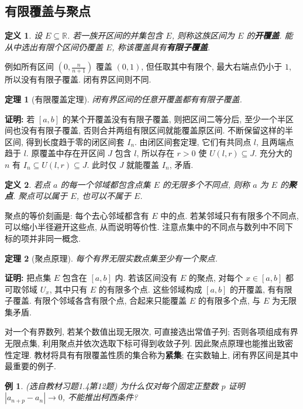 \documentclass[UTF8,openany]{ctexbook}
\theoremstyle{chinesetextbook}
\newtheorem{definition}{定义}[section]
\newtheorem{example}{例}[section]
\newtheorem{theorem}{定理}[section]
\newenvironment{cnproof}{\par\indent\textbf{证明:} \ignorespaces}{\par}
\begin{document}
\subsection{有限覆盖与聚点}
\begin{definition}
设 $E\subseteq\mathbb R$. 若一族开区间的并集包含 $E$, 则称这族区间为 $E$ 的\textbf{开覆盖}. 能从中选出有限个区间仍覆盖 $E$, 称该覆盖具有\textbf{有限子覆盖}.
\end{definition}
例如所有区间 $\displaystyle (0,\frac n{n+1})$ 覆盖 $(0,1)$, 但任取其中有限个, 最大右端点仍小于 $1$, 所以没有有限子覆盖. 闭有界区间则不同.
\begin{theorem}[有限覆盖定理]
闭有界区间的任意开覆盖都有有限子覆盖.
\end{theorem}
\begin{cnproof}
若 $[a,b]$ 的某个开覆盖没有有限子覆盖, 则把区间二等分后, 至少一个半区间也没有有限子覆盖, 否则合并两组有限区间就能覆盖原区间. 不断保留这样的半区间, 得到长度趋于零的闭区间套 $I_n$. 由闭区间套定理, 它们有共同点 $l$, 且两端点趋于 $l$. 原覆盖中存在开区间 $J$ 包含 $l$, 所以存在 $r>0$ 使 $U(l,r)\subseteq J$. 充分大的 $n$ 有 $I_n\subseteq U(l,r)\subseteq J$. 此时仅 $J$ 就能覆盖 $I_n$, 矛盾.
\end{cnproof}
\begin{definition}
若点 $a$ 的每一个邻域都包含点集 $E$ 的无限多个不同点, 则称 $a$ 为 $E$ 的\textbf{聚点}. 聚点可以属于 $E$, 也可以不属于 $E$.
\end{definition}
聚点的等价刻画是: 每个去心邻域都含有 $E$ 中的点. 若某邻域只有有限多个不同点, 可以缩小半径避开这些点, 从而说明等价性. 注意点集中的不同点与数列中不同下标的项并非同一概念.
\begin{theorem}[聚点原理]
每个有界无限实数点集至少有一个聚点.
\end{theorem}
\begin{cnproof}
把点集 $E$ 包含在 $[a,b]$ 内. 若该区间没有 $E$ 的聚点, 对每个 $x\in[a,b]$ 都可取邻域 $U_x$, 其中只有 $E$ 的有限多个点. 这些邻域构成 $[a,b]$ 的开覆盖, 有有限子覆盖. 有限个邻域各含有限个点, 合起来只能覆盖 $E$ 的有限多个点, 与 $E$ 为无限集矛盾.
\end{cnproof}
对一个有界数列, 若某个数值出现无限次, 可直接选出常值子列; 否则各项组成有界无限点集, 利用聚点并依次选取下标可得到收敛子列. 因此聚点原理也能推出致密性定理. 教材将具有有限覆盖性质的集合称为\textbf{紧集}; 在实数轴上, 闭有界区间是其中最重要的例子.
\begin{example}
(选自教材习题1.4第12题) 为什么仅对每个固定正整数 $p$ 证明 $|a_{n+p}-a_n|\to0$, 不能推出柯西条件?
\end{example}
\end{document}
